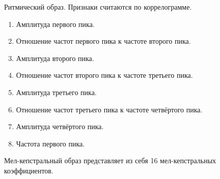 Ритмический образ.
Признаки считаются по коррелограмме.
\begin{enumerate}[label=\arabic*.]
\item Амплитуда первого пика.
\item Отношение частот первого пика к частоте второго пика.
\item Амплитуда второго пика.
\item Отношение частот второго пика к частоте третьего пика.
\item Амплитуда третьего пика.
\item Отношение частот третьего пика к частоте четвёртого пика.
\item Амплитуда четвёртого пика.
\item Частота первого пика.
\end{enumerate}

Мел-кепстральный образ представляет из себя 16 мел-кепстральных коэффициентов.
